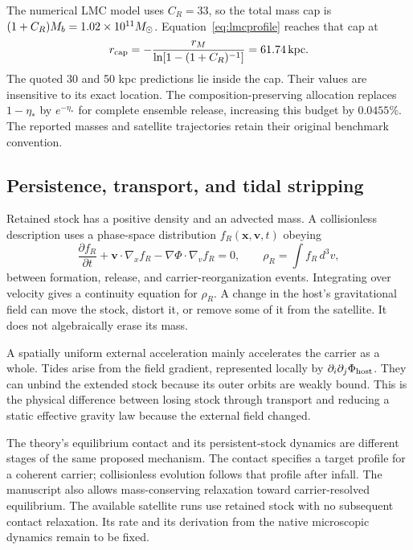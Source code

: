 The numerical LMC model uses $C_R=33$, so the total mass cap is
$(1+C_R)M_b=1.02\times10^{11}M_\odot$. Equation~\eqref{eq:lmcprofile} reaches
that cap at
\begin{equation}
r_{\rm cap}=-\frac{r_M}{\ln[1-(1+C_R)^{-1}]}=61.74\,\mathrm{kpc}.
\end{equation}
The quoted 30 and 50 kpc predictions lie inside the cap. Their values
are insensitive to its exact location. The composition-preserving
allocation replaces $1-\eta_*$ by $e^{-\eta_*}$ for complete ensemble
release, increasing this budget by $0.0455\%$. The reported masses and
satellite trajectories retain their original benchmark convention. 

\subsection{Persistence, transport, and tidal stripping}

Retained stock has a positive density and an advected mass. A collisionless
description uses a phase-space distribution $f_R(\mathbf x,\mathbf v,t)$
obeying
\begin{equation}
\frac{\partial f_R}{\partial t}
+\mathbf v\cdot\nabla_x f_R
-\nabla\Phi\cdot\nabla_v f_R=0,
\qquad
\rho_R=\int f_R\,d^3v,
\label{eq:vlasov}
\end{equation}
between formation, release, and carrier-reorganization events. Integrating
over velocity gives a continuity equation for $\rho_R$. A change in the
host's gravitational field can move the stock, distort it, or remove some
of it from the satellite. It does not algebraically erase its mass.

A spatially uniform external acceleration mainly accelerates the carrier
as a whole. Tides arise from the field gradient, represented locally by
$\partial_i\partial_j\Phi_{\rm host}$. They can unbind the extended stock
because its outer orbits are weakly bound. This is the physical difference
between losing stock through transport and reducing a static effective
gravity law because the external field changed.

The theory's equilibrium contact and its persistent-stock dynamics are
different stages of the same proposed mechanism. The contact specifies a
target profile for a coherent carrier; collisionless evolution follows
that profile after infall. The manuscript also allows mass-conserving
relaxation toward carrier-resolved equilibrium. The available satellite
runs use retained stock with no subsequent contact relaxation. Its rate
and its derivation from the native microscopic dynamics remain to be fixed.

